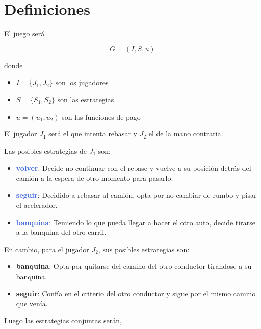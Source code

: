 \documentclass{article}
\newcommand{\stratU}[1]{\textbf{\textcolor{RoyalBlue}{#1}}}
\newcommand{\stratD}[1]{\textbf{\textcolor{RedOrange}{#1}}}
\begin{document}
\section*{Definiciones}

El juego será

$$G = (I, S, u)$$

donde

\begin{itemize}
    \item $I = \{ J_1, J_2 \}$ son los jugadores
    \item $S = \{ S_1, S_2 \}$ son las estrategias
    \item $u = (u_1, u_2)$ son las funciones de pago
\end{itemize}


El jugador $J_1$ será el que intenta rebasar y $J_2$ el de la mano contraria.

Las posibles estrategias de $J_1$ son:

\begin{itemize}
 \item \stratU{volver}: Decide no continuar con el rebase y vuelve a su posición detrás del camión a la espera de otro momento para pasarlo.
 
 \item \stratU{seguir}: Decidido a rebasar al camión, opta por no cambiar de rumbo y pisar el acelerador.
 
 \item \stratU{banquina}: Temiendo lo que pueda llegar a hacer el otro auto, decide tirarse a la banquina del otro carril.

\end{itemize}

En cambio, para el jugador $J_2$, sus posibles estrategias son:

\begin{itemize}
    \item \stratD{banquina}: Opta por quitarse del camino del otro conductor tirandose a su banquina.
    \item \stratD{seguir}: Confía en el criterio del otro conductor y sigue por el mismo camino que venía.
    
\end{itemize}

Luego las estrategias conjuntas serán,
\end{document}
